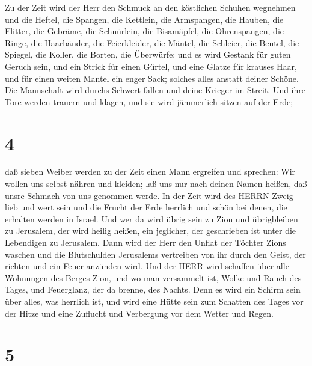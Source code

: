  Zu der Zeit wird der Herr den Schmuck an den köstlichen
Schuhen wegnehmen und die Heftel, die Spangen,  die
Kettlein, die Armspangen, die Hauben,  die Flitter, die
Gebräme, die Schnürlein, die Bisamäpfel, die Ohrenspangen, 
die Ringe, die Haarbänder,  die Feierkleider, die Mäntel,
die Schleier, die Beutel,  die Spiegel, die Koller, die
Borten, die Überwürfe;  und es wird Gestank für guten
Geruch sein, und ein Strick für einen Gürtel, und eine Glatze für
krauses Haar, und für einen weiten Mantel ein enger Sack; solches alles
anstatt deiner Schöne.  Die Mannschaft wird durchs Schwert
fallen und deine Krieger im Streit.  Und ihre Tore werden
trauern und klagen, und sie wird jämmerlich sitzen auf der Erde;

\hypertarget{section-3}{%
\section{4}\label{section-3}}

 daß sieben Weiber werden zu der Zeit einen Mann ergreifen
und sprechen: Wir wollen uns selbst nähren und kleiden; laß uns nur nach
deinen Namen heißen, daß unsre Schmach von uns genommen werde.
 In der Zeit wird des HERRN Zweig lieb und wert sein und die
Frucht der Erde herrlich und schön bei denen, die erhalten werden in
Israel.  Und wer da wird übrig sein zu Zion und übrigbleiben
zu Jerusalem, der wird heilig heißen, ein jeglicher, der geschrieben ist
unter die Lebendigen zu Jerusalem.  Dann wird der Herr den
Unflat der Töchter Zions waschen und die Blutschulden Jerusalems
vertreiben von ihr durch den Geist, der richten und ein Feuer anzünden
wird.  Und der HERR wird schaffen über alle Wohnungen des
Berges Zion, und wo man versammelt ist, Wolke und Rauch des Tages, und
Feuerglanz, der da brenne, des Nachts. Denn es wird ein Schirm sein über
alles, was herrlich ist,  und wird eine Hütte sein zum
Schatten des Tages vor der Hitze und eine Zuflucht und Verbergung vor
dem Wetter und Regen.

\hypertarget{section-4}{%
\section{5}\label{section-4}}

